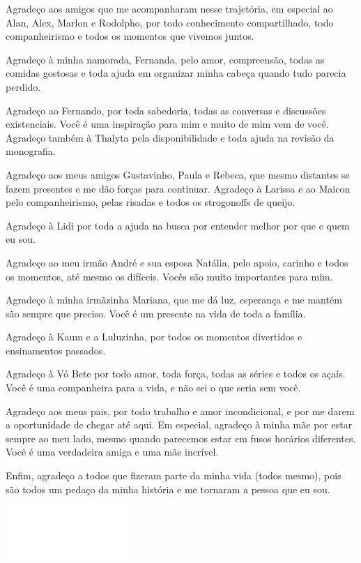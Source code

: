 \documentclass[12pt,a4paper]{report}
\begin{document}
Agradeço aos amigos que me acompanharam nesse trajetória, em especial ao Alan, Alex, Marlon e Rodolpho, por
todo conhecimento compartilhado, todo companheirismo e todos os momentos que vivemos juntos.

Agradeço à minha namorada, Fernanda, pelo amor, compreensão, todas as comidas gostosas e toda ajuda em organizar
minha cabeça quando tudo parecia perdido.

Agradeço ao Fernando, por toda sabedoria, todas as conversas e discussões existenciais. Você é uma inspiração
para mim e muito de mim vem de você. Agradeço também à Thalyta pela disponibilidade e toda ajuda na revisão da
monografia.

Agradeço aos meus amigos Gustavinho, Paula e Rebeca, que mesmo distantes se fazem presentes e me dão forças
para continuar. Agradeço à Larissa e ao Maicon pelo companheirismo, pelas risadas e todos os strogonoffs de
queijo.

Agradeço à Lidi por toda a ajuda na busca por entender melhor por que e quem eu sou.

Agradeço ao meu irmão André e sua esposa Natália, pelo apoio, carinho e todos os momentos, até mesmo os
difíceis. Vocês são muito importantes para mim.

Agradeço à minha irmãzinha Mariana, que me dá luz, esperança e me mantém são sempre que preciso. Você é um
presente na vida de toda a família.

Agradeço à Kaum e a Luluzinha, por todos os momentos divertidos e ensinamentos passados.

Agradeço à Vó Bete por todo amor, toda força, todas as séries e todos os açaís. Você é uma companheira para a
vida, e não sei o que seria sem você.

Agradeço aos meus pais, por todo trabalho e amor incondicional, e por me darem a oportunidade de chegar até
aqui. Em especial, agradeço à minha mãe por estar sempre ao meu lado, mesmo quando parecemos estar em fusos
horários diferentes. Você é uma verdadeira amiga e uma mãe incrível.

Enfim, agradeço a todos que fizeram parte da minha vida (todos mesmo), pois são todos um pedaço da minha
história e me tornaram a pessoa que eu sou.

\thispagestyle{empty}
\clearpage

\begin{minipage}{0.49\linewidth}
  \includegraphics[scale=0.01]{images/branco} 
\end{minipage}\\[18cm]
\end{document}
